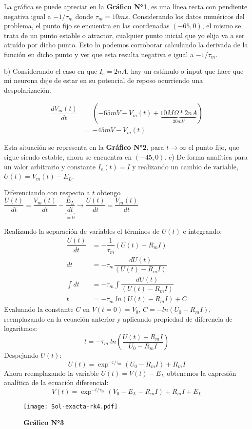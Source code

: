 \documentclass[12pt,a4paper]{article}
\begin{document}
La gráfica se puede apreciar en la \textbf{Gráfico N°1}, es una línea recta con pendiente negativa igual a $-1/\tau_m$ donde $\tau_m = 10ms$. Considerando los datos numéricos del problema, el punto fijo se encuentra en las coordenadas $(-65,0)$, el mismo se trata de un punto estable o atractor, cualquier punto inicial que yo elija va a ser atraído por dicho punto. Esto lo podemos corroborar calculando la derivada de la función en dicho punto y ver que esta resulta negativa e igual a $-1/\tau_m$.
\bigskip

b) Considerando el caso en que $I_e = 2nA$, hay un estímulo o input que hace que mi neurona deje de estar en su potencial de reposo ocurriendo una despolarización. 

\begin{align*}
\dfrac{dV_m(t)}{dt}&= (-65mV-V_m(t)+\underbrace{10M\Omega*2nA}_{20mV})\\
&= -45mV - V_m(t)
\end{align*}

Esta situación se representa en la \textbf{Gráfico N°2}, para $t\rightarrow \infty$ el punto fijo, que sigue siendo estable, ahora se encuentra en $(-45, 0)$.
\newpage
c) De forma analítica para un valor arbitrario y constante $I_e(t)=I$ y realizando un cambio de variable, $U(t)= V_m(t)-E_L$.

Diferenciando con respecto a $t$ obtengo $\dfrac{U(t)}{dt} = \dfrac{V_m(t)}{dt}-\underbrace{\dfrac{E_L}{dt}}_{=0} \rightarrow \boxed{\dfrac{U(t)}{dt} = \dfrac{V_m(t)}{dt}}$

Realizando la separación de variables el términos de $U(t)$ e integrando: 
\begin{align*}
\dfrac{U(t)}{dt} &= -\dfrac{1}{\tau_m}(U(t)-R_mI) \\
dt &= -\tau_m \dfrac{dU(t)}{(U(t)-R_mI)} \\
\int{dt} &= -\tau_m \int{\dfrac{dU(t)}{(U(t)-R_mI)}} \\
t &= -\tau_m \ ln(U(t)-R_mI) + C
\end{align*}
Evaluando la constante $C$ en $V(t=0)=V_0$, $C=-ln(U_0-R_mI)$, reemplazando en la ecuación anterior y aplicando propiedad de diferencia de logaritmos:
$$t = -\tau_m \ ln\left( \dfrac{U(t)-R_mI}{U_0-R_mI}\right)$$
Despejando $U(t)$:
$$U(t) = \exp^{-t/ \tau_m}(U_0 - R_mI)+R_mI$$
Ahora reemplazando la variable $U(t)=V(t)-E_L$ obtenemos la expresión analítica de la ecuación diferencial:
$$V(t)=\exp^{-t/ \tau_m}(V_0-E_L-R_mI)+R_mI+E_L$$

\begin{wrapfigure}[15]{r}{10cm}
\caption*{\textbf{Gráfico N°3}}
\label{Sol-exacta-rk4.pdf}
\texttt{[image: Sol-exacta-rk4.pdf]}
\end{wrapfigure}
\end{document}
